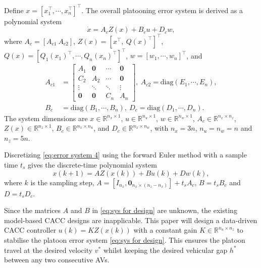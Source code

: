 \documentclass[letterpaper, 10 pt, conference]{ieeeconf}
\begin{document}
	Define 
	$x \!=\! [x_1^\top, \cdots, x_n^\top]^\top$.
	The overall platooning error system is derived as a polynomial system
	\begin{equation} \label{eq:error system 4}
		\dot{x} = A_c Z(x) + B_c u + D_c w,
	\end{equation} 
	where $A_c = [A_{c1} ~ A_{c2}]$, $Z(x) = [x^\top,~Q(x)^\top]^\top$, $Q(x) = [Q_1(x_1)^\top, \cdots, Q_n(x_n)^\top]^\top$,
	$w = [w_1, \cdots, w_n]^\top$,  and
	\begin{align}
		A_{c1} &= \begin{bmatrix}
			A_1 	   & \mathbf{0} &  \cdots & 
			\mathbf{0}\\
			C_2 	   & A_2  		&  \cdots & 
			\mathbf{0}\\
			\vdots & \ddots & \ddots & \vdots\\
			\mathbf{0} & \mathbf{0}  & C_n       	& A_n  
		\end{bmatrix}, ~
		A_{c2} = \mathrm{diag}(E_1, \cdots, E_n),
		\nonumber\\
		B_c &= \mathrm{diag}(B_1, \cdots, B_n), ~
		D_c = \mathrm{diag}(D_1, \cdots, D_n).
		\nonumber
	\end{align} 
	The system dimensions are $x \in \mathbb{R}^{n_x \times 1}$, $u \in 
	\mathbb{R}^{n_u \times 1}$, $w \in \mathbb{R}^{n_w \times 1}$, $A_c \in 
	\mathbb{R}^{n_x \times n_z}$, 
	$Z(x) \in \mathbb{R}^{n_z \times 1}$, $B_c \in \mathbb{R}^{n_x \times n_u}$, and $D_c \in \mathbb{R}^{n_x \times n_w}$, 
	with $n_x = 3n$, $n_u = n_w = n$ and $n_z = 5n$. 
	
	Discretizing \eqref{eq:error system 4} using the forward Euler method with a sample time $t_s$ gives the discrete-time polynomial system 
	\begin{equation} \label{eq:sys for design}
		x(k+1) = A Z(x(k)) + B u(k) + D w(k),
	\end{equation}
	where $k$ is the sampling step, 
	$A = [I_{n_x}, \mathbf{0}_{n_x \times (n_z-n_x)}] + t_s A_c$, $B = t_s B_c$ and $D = t_s D_c$. 
	
	Since the matrices $A$ and $B$ in \eqref{eq:sys for design} are unknown, the existing model-based CACC designs \cite{Li+17d,guanetti2018control,lan2020min}  are inapplicable. 
	This paper will design a data-driven CACC controller $u(k) = K Z(x(k))$ with a constant gain $K 
	\in \mathbb{R}^{n_u \times n_z}$ to stabilise the platoon error system \eqref{eq:sys for design}. This ensures the platoon 
	travel at the desired velocity $v^*$ whilst keeping the desired 
	vehicular gap $h^*$ between any two consecutive AVs.
	
\end{document}
